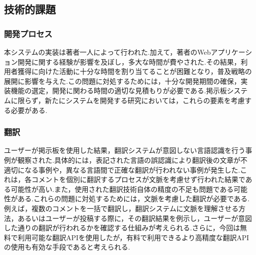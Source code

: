 \documentclass[b5paper,12pt,dvipdfmx]{jsreport}
\begin{document}
\subsection{技術的課題}

\subsubsection{開発プロセス}
本システムの実装は著者一人によって行われた.加えて，著者のWebアプリケーション開発に関する経験が影響を及ぼし，多大な時間が費やされた.その結果，利用者獲得に向けた活動に十分な時間を割り当てることが困難となり，普及戦略の展開に影響を与えた.この問題に対処するためには，十分な開発期間の確保，実装機能の選定，開発に関わる時間の適切な見積もりが必要である.掲示板システムに限らず，新たにシステムを開発する研究においては，これらの要素を考慮する必要がある.

\subsubsection{翻訳}
ユーザーが掲示板を使用した結果，翻訳システムが意図しない言語認識を行う事例が観察された.具体的には，表記された言語の誤認識により翻訳後の文章が不適切になる事例や，異なる言語間で正確な翻訳が行われない事例が発生した.これは，各コメントを個別に翻訳するプロセスが文脈を考慮せず行われた結果である可能性が高い.また，使用された翻訳技術自体の精度の不足も問題である可能性がある.これらの問題に対処するためには，文脈を考慮した翻訳が必要である.例えば，複数のコメントを一括で翻訳し，翻訳システムに文脈を理解させる方法，あるいはユーザーが投稿する際に，その翻訳結果を例示し，ユーザーが意図した通りの翻訳が行われるかを確認する仕組みが考えられる.さらに，今回は無料で利用可能な翻訳APIを使用したが，有料で利用できるより高精度な翻訳APIの使用も有効な手段であると考えられる.





\end{document}
